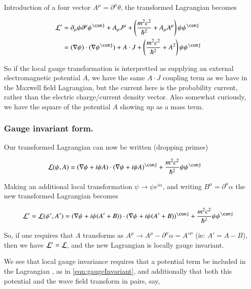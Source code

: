 \documentclass{article}
\begin{document}
Introduction of a four vector $A^\mu = \partial^\mu \theta$, the transformed Lagrangian becomes

\begin{align}
\LL'
&=
\partial_\mu \psi \partial^\mu \psi^\conj
+ A_\mu J^\mu
+ \left( \frac{m^2 c^2}{\hbar^2} + A_\mu A^\mu \right) \psi {\psi}^\conj \\
&=
(\grad \psi) \cdot (\grad \psi^\conj) + A \cdot J
+ \left( \frac{m^2 c^2}{\hbar^2} + A^2 \right) \psi {\psi}^\conj
\end{align}

So if the local gauge transformation is interpretted as supplying an external electromagnetic potential $A$, we have the same $A \cdot J$ coupling term
as we have in the Maxwell field Lagrangian, but the current here is the probability current, rather than the electric charge/current density vector.  Also
somewhat curiously, we have the square of the potential $A$ showing up as a mass term.

\subsubsection{ Gauge invariant form. }

Our transformed Lagrangian can now be written (dropping primes)

\begin{align}\label{eqn:gaugeInvariant}
\LL(\psi, A)
&=
(\grad \psi + i \psi A) \cdot (\grad \psi + i \psi A)^\conj
+ \frac{m^2 c^2}{\hbar^2} \psi {\psi}^\conj
\end{align}

Making an additional local transformation $\psi \rightarrow \psi e^{i\alpha}$, and writing $B^\mu = \partial^\mu \alpha$ the new transformed Lagrangian becomes

\begin{align*}
\LL' = \LL(\psi', A')
&=
(\grad \psi + i \psi (A'+B)) \cdot (\grad \psi + i \psi (A'+B))^\conj
+ \frac{m^2 c^2}{\hbar^2} \psi {\psi}^\conj \\
\end{align*}

So, if one requires that $A$ transforms as $A^\mu \rightarrow A^\mu - \partial^\mu \alpha = {A'}^\mu$ (ie: $A' = A - B$), then we have $\mathcal{L}' = \mathcal{L}$, and
the new Lagrangian is locally gauge invariant.

We see that local gauge invariance requires that a potential term be included in the Lagrangian
, as in \ref{eqn:gaugeInvariant}, and additionally that both this potential and the wave field transform in pairs, say,
\end{document}
